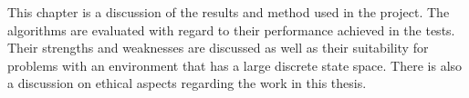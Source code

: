 This chapter is a discussion of the results and method used in the project. The algorithms are evaluated with regard to their performance achieved in the tests. Their strengths and weaknesses are discussed as well as their suitability for problems with an environment that has a large discrete state space. There is also a discussion on ethical aspects regarding the work in this thesis.